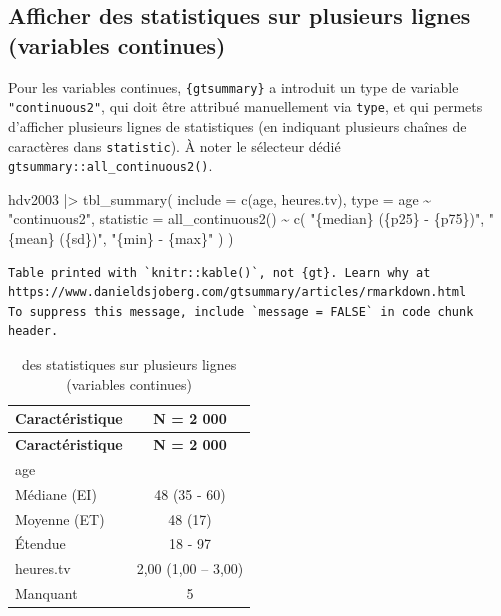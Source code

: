 \documentclass[
  letterpaper,
  DIV=11,
  numbers=noendperiod,
  oneside]{scrreprt}
\newenvironment{Shaded}{\begin{snugshade}}{\end{snugshade}}
\newcommand{\AttributeTok}[1]{\textcolor[rgb]{0.40,0.45,0.13}{#1}}
\newcommand{\FunctionTok}[1]{\textcolor[rgb]{0.28,0.35,0.67}{#1}}
\newcommand{\NormalTok}[1]{\textcolor[rgb]{0.00,0.23,0.31}{#1}}
\newcommand{\SpecialCharTok}[1]{\textcolor[rgb]{0.37,0.37,0.37}{#1}}
\newcommand{\StringTok}[1]{\textcolor[rgb]{0.13,0.47,0.30}{#1}}
\begin{document}
\hypertarget{afficher-des-statistiques-sur-plusieurs-lignes-variables-continues}{%
\subsection{Afficher des statistiques sur plusieurs lignes (variables
continues)}\label{afficher-des-statistiques-sur-plusieurs-lignes-variables-continues}}

Pour les variables continues, \texttt{\{gtsummary\}} a introduit un type
de variable \texttt{"continuous2"}, qui doit être attribué manuellement
via \texttt{type}, et qui permets d'afficher plusieurs lignes de
statistiques (en indiquant plusieurs chaînes de caractères dans
\texttt{statistic}). À noter le sélecteur dédié
\texttt{gtsummary::all\_continuous2()}.

\begin{Shaded}
\begin{Highlighting}[]
\NormalTok{hdv2003 }\SpecialCharTok{|\textgreater{}}
  \FunctionTok{tbl\_summary}\NormalTok{(}
    \AttributeTok{include =} \FunctionTok{c}\NormalTok{(age, heures.tv),}
    \AttributeTok{type =}\NormalTok{ age }\SpecialCharTok{\textasciitilde{}} \StringTok{"continuous2"}\NormalTok{,}
    \AttributeTok{statistic =} 
      \FunctionTok{all\_continuous2}\NormalTok{() }\SpecialCharTok{\textasciitilde{}} \FunctionTok{c}\NormalTok{(}
        \StringTok{"\{median\} (\{p25\} {-} \{p75\})"}\NormalTok{, }
        \StringTok{"\{mean\} (\{sd\})"}\NormalTok{,}
        \StringTok{"\{min\} {-} \{max\}"}
\NormalTok{      )}
\NormalTok{  )}
\end{Highlighting}
\end{Shaded}

\begin{verbatim}
Table printed with `knitr::kable()`, not {gt}. Learn why at
https://www.danieldsjoberg.com/gtsummary/articles/rmarkdown.html
To suppress this message, include `message = FALSE` in code chunk header.
\end{verbatim}

\hypertarget{tbl-continuous2}{}
\begin{longtable}[]{@{}lc@{}}
\caption{\label{tbl-continuous2}des statistiques sur plusieurs lignes
(variables continues)}\tabularnewline
\toprule()
\textbf{Caractéristique} & \textbf{N = 2 000} \\
\midrule()
\endfirsthead
\toprule()
\textbf{Caractéristique} & \textbf{N = 2 000} \\
\midrule()
\endhead
age & \\
Médiane (EI) & 48 (35 - 60) \\
Moyenne (ET) & 48 (17) \\
Étendue & 18 - 97 \\
heures.tv & 2,00 (1,00 -- 3,00) \\
Manquant & 5 \\
\bottomrule()
\end{longtable}
\end{document}
